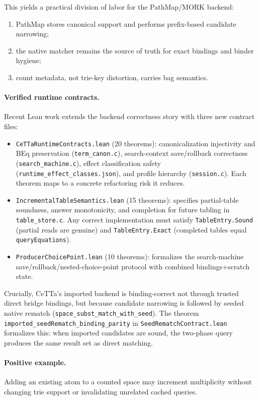 \documentclass[11pt]{article}
\newcommand{\code}[1]{\texttt{#1}}
\newcommand{\CeTTa}{\textup{CeTTa}}
\newcommand{\PathMap}{\textup{PathMap}}
\begin{document}
This yields a practical division of labor for the PathMap/MORK backend:
\begin{enumerate}
\item \PathMap{} stores canonical support and performs prefix-based candidate
  narrowing;
\item the native matcher remains the source of truth for exact bindings and
  binder hygiene;
\item count metadata, not trie-key distortion, carries bag semantics.
\end{enumerate}

\paragraph{Verified runtime contracts.}
Recent Lean work extends the backend correctness story with three new contract files:
\begin{itemize}
\item \code{CeTTaRuntimeContracts.lean} (20 theorems): canonicalization injectivity and BEq preservation (\code{term\_canon.c}), search-context save/rollback correctness (\code{search\_machine.c}), effect classification safety (\code{runtime\_effect\_classes.json}), and profile hierarchy (\code{session.c}).  Each theorem maps to a concrete refactoring risk it reduces.
\item \code{IncrementalTableSemantics.lean} (15 theorems): specifies partial-table soundness, answer monotonicity, and completion for future tabling in \code{table\_store.c}.  Any correct implementation must satisfy \code{TableEntry.Sound} (partial reads are genuine) and \code{TableEntry.Exact} (completed tables equal \code{queryEquations}).
\item \code{ProducerChoicePoint.lean} (10 theorems): formalizes the search-machine save/rollback/nested-choice-point protocol with combined bindings+scratch state.
\end{itemize}

Crucially, \CeTTa{}'s imported backend is binding-correct not through trusted direct bridge bindings, but because candidate narrowing is followed by seeded native rematch (\code{space\_subst\_match\_with\_seed}).  The theorem \code{imported\_seedRematch\_binding\_parity} in \code{SeedRematchContract.lean} formalizes this: when imported candidates are sound, the two-phase query produces the same result set as direct matching.

\paragraph{Positive example.}
Adding an existing atom to a counted space may increment multiplicity without
changing trie support or invalidating unrelated cached queries.
\end{document}
